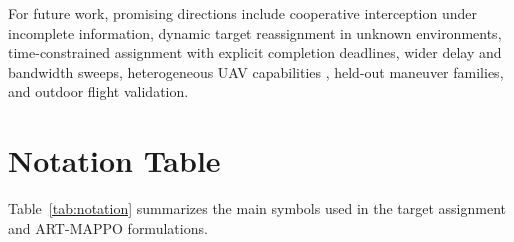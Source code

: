 \documentclass[lettersize,journal]{IEEEtran}
\providecommand{\DIFadd}[1]{{\protect\color{blue} #1}} %
\providecommand{\DIFdel}[1]{} %
\providecommand{\DIFaddbegin}{} %
\providecommand{\DIFaddend}{} %
\providecommand{\DIFdelbegin}{} %
\providecommand{\DIFdelend}{} %
\begin{document}
For future work, promising directions include cooperative interception under incomplete
information, dynamic target reassignment in unknown environments, time-constrained assignment
with explicit completion deadlines, \DIFdelbegin \DIFdel{and integration with realistic constraints such as
communication delays, limited bandwidth , and }\DIFdelend \DIFaddbegin \DIFadd{wider delay and bandwidth sweeps,
}\DIFaddend heterogeneous UAV capabilities\DIFaddbegin \DIFadd{, held-out maneuver families, and outdoor flight
validation}\DIFaddend .




\appendices
\section{Notation Table}
\label{app:notation}

Table~\ref{tab:notation} summarizes the main symbols used in the target assignment and
ART-MAPPO formulations.
\end{document}
